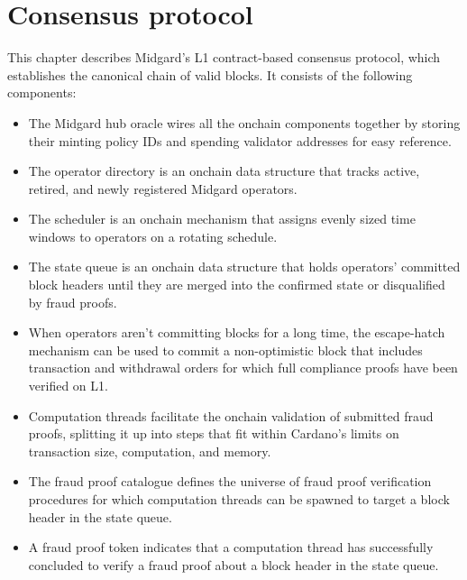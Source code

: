 \documentclass[../midgard.tex]{subfiles}
\begin{document}
\chapter{Consensus protocol}
\label{h:consensus-protocol}

This chapter describes Midgard's L1 contract-based consensus protocol, which establishes the canonical chain of valid blocks. It consists of the following components:

\begin{itemize}
    \item The Midgard hub oracle wires all the onchain components together by storing their minting policy IDs and spending validator addresses for easy reference.
    \item The operator directory is an onchain data structure that tracks active, retired, and newly registered Midgard operators.
    \item The scheduler is an onchain mechanism that assigns evenly sized time windows to operators on a rotating schedule.
    \item The state queue is an onchain data structure that holds operators' committed block headers until they are merged into the confirmed state or disqualified by fraud proofs.
    \item When operators aren't committing blocks for a long time, the escape-hatch mechanism can be used to commit a non-optimistic block that includes transaction and withdrawal orders for which full compliance proofs have been verified on L1. 
    \item Computation threads facilitate the onchain validation of submitted fraud proofs, splitting it up into steps that fit within Cardano's limits on transaction size, computation, and memory.
    \item The fraud proof catalogue defines the universe of fraud proof verification procedures for which computation threads can be spawned to target a block header in the state queue.
    \item A fraud proof token indicates that a computation thread has successfully concluded to verify a fraud proof about a block header in the state queue. 
\end{itemize}
\end{document}
